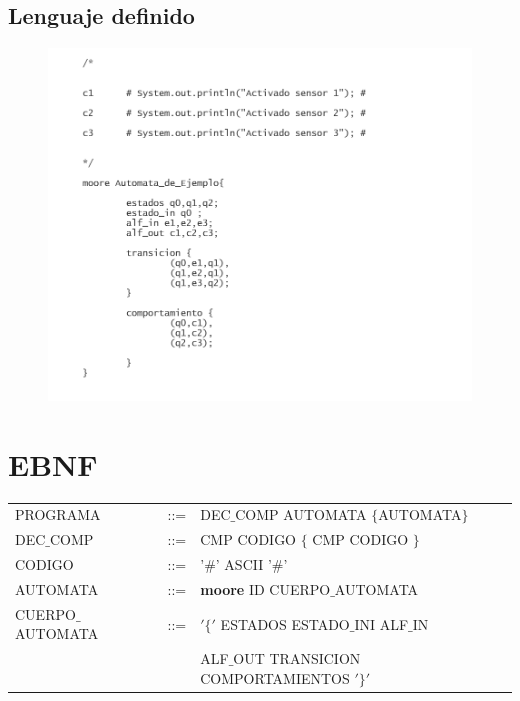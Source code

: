 \documentclass[12pt,a4paper]{article}
\begin{document}
{	\subsection{Lenguaje definido}
	\begin{center}
\begin{figure}[h]
	\centering
	\includegraphics[width=0.8\linewidth]{img/aut}
	\caption{}
	\label{fig:aut}
\end{figure}

	\end{center}
	
	

	\newpage
	\section{EBNF}
			\begin{center}
			\begin{tabular}{lcl}
	

				PROGRAMA & ::= & DEC$\_$COMP AUTOMATA $\{$AUTOMATA$\}$ \\ 
				 
				
				DEC$\_$COMP & ::= &CMP  CODIGO $\{$ CMP CODIGO $\}$ \\ 
			
				CODIGO 	&::= &'$\#$' ASCII '$\#$' \\ 
				
				AUTOMATA & ::= & \textbf{moore} ID CUERPO$\_$AUTOMATA \\
				
			
				CUERPO$\_$AUTOMATA	& ::= & $'\{'$ ESTADOS ESTADO$\_$INI ALF$\_$IN  \\ 
				
					& &  ALF$\_$OUT TRANSICION COMPORTAMIENTOS $'\}'$ \\ 
				

\end{tabular}
\end{center}}
\end{document}
